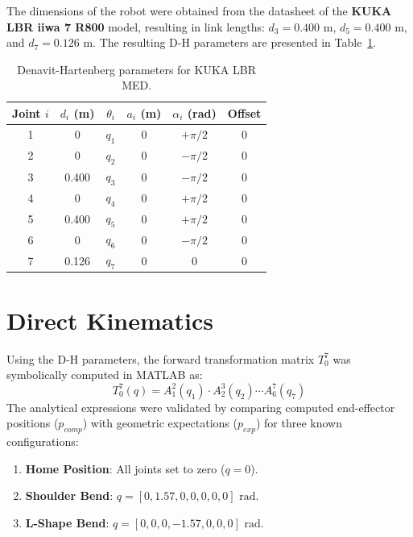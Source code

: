 \documentclass[11pt,a4paper]{article}
\begin{document}
The dimensions of the robot were obtained from the datasheet of the \textbf{KUKA LBR iiwa 7 R800} model, resulting in link lengths: $d_3 = 0.400\text{ m}$, $d_5 = 0.400\text{ m}$, and $d_7 = 0.126\text{ m}$. The resulting D-H parameters are presented in Table~\ref{tab:dh_parameters}.

\begin{table}[H]
\centering
\caption{Denavit-Hartenberg parameters for KUKA LBR MED.}
\label{tab:dh_parameters}
\begin{tabular}{@{}cccccc@{}}
\toprule
Joint $i$ & $d_i$ (m) & $\theta_i$ & $a_i$ (m) & $\alpha_i$ (rad) & Offset \\ \midrule
1         & 0         & $q_1$      & 0         & $+\pi/2$         & 0      \\
2         & 0         & $q_2$      & 0         & $-\pi/2$         & 0      \\
3         & 0.400     & $q_3$      & 0         & $-\pi/2$         & 0      \\
4         & 0         & $q_4$      & 0         & $+\pi/2$         & 0      \\
5         & 0.400     & $q_5$      & 0         & $+\pi/2$         & 0      \\
6         & 0         & $q_6$      & 0         & $-\pi/2$         & 0      \\
7         & 0.126     & $q_7$      & 0         & 0                & 0      \\ \bottomrule
\end{tabular}
\end{table}

\section{Direct Kinematics}
Using the D-H parameters, the forward transformation matrix $T_0^7$ was symbolically computed in MATLAB as:
\begin{equation}
T_0^7(q) = A_1^2(q_1) \cdot A_2^3(q_2) \cdots A_6^7(q_7)
\end{equation}
The analytical expressions were validated by comparing computed end-effector positions ($p_{comp}$) with geometric expectations ($p_{exp}$) for three known configurations:
\begin{enumerate}
    \item \textbf{Home Position}: All joints set to zero ($q = 0$).
    \item \textbf{Shoulder Bend}: $q = [0, 1.57, 0, 0, 0, 0, 0]\text{ rad}$.
    \item \textbf{L-Shape Bend}: $q = [0, 0, 0, -1.57, 0, 0, 0]\text{ rad}$.
\end{enumerate}
\end{document}
